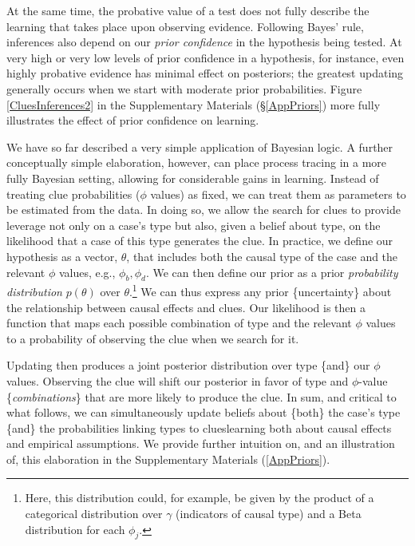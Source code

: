 \documentclass[12pt,]{book}
\let\rmarkdownfootnote\footnote%
\def\footnote{\protect\rmarkdownfootnote}
\begin{document}
At the same time, the probative value of a test does not fully describe the learning that takes place upon observing evidence. Following Bayes' rule, inferences also depend on our \emph{prior confidence} in the hypothesis being tested. At very high or very low levels of prior confidence in a hypothesis, for instance, even highly probative evidence has minimal effect on posteriors; the greatest updating generally occurs when we start with moderate prior probabilities. Figure \ref{CluesInferences2} in the Supplementary Materials (\S\ref{AppPriors}) more fully illustrates the effect of prior confidence on learning.

We have so far described a very simple application of Bayesian logic. A further conceptually simple elaboration, however, can place process tracing in a more fully Bayesian setting, allowing for considerable gains in learning. Instead of treating clue probabilities (\(\phi\) values) as fixed, we can treat them as parameters to be estimated from the data. In doing so, we allow the search for clues to provide leverage not only on a case's type but also, given a belief about type, on the likelihood that a case of this type generates the clue. In practice, we define our hypothesis as a vector, \(\theta\), that includes both the causal type of the case and the relevant \(\phi\) values, e.g., \(\phi_b, \phi_d\). We can then define our prior as a prior \emph{probability distribution} \(p(\theta)\) over \(\theta\).\footnote{Here, this distribution could, for example, be given by the product of a categorical distribution over \(\gamma\) (indicators of causal type) and a Beta distribution for each \(\phi_j\).} We can thus express any prior \{uncertainty\} about the relationship between causal effects and clues. Our likelihood is then a function that maps each possible combination of type and the relevant \(\phi\) values to a probability of observing the clue when we search for it.

Updating then produces a joint posterior distribution over type \{and\} our \(\phi\) values. Observing the clue will shift our posterior in favor of type and \(\phi\)-value \{\emph{combinations}\} that are more likely to produce the clue. In sum, and critical to what follows, we can simultaneously update beliefs about \{both\} the case's type \{and\} the probabilities linking types to clues\textbar{}learning both about causal effects and empirical assumptions. We provide further intuition on, and an illustration of, this elaboration in the Supplementary Materials (\ref{AppPriors}).
\end{document}
